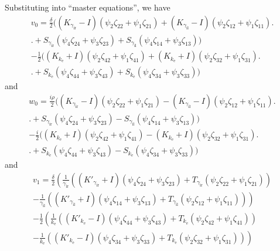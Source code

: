 Substituting into ``master equations'', we have
\begin{multline*}
  v_0 = \frac{\delta}{2} \bigl((K_{\gamma_\text{ir}}-I)(\psi_2 \zeta_{22}+\psi_1 \zeta_{21}) +(K_{\gamma_\text{il}}-I)(\psi_2 \zeta_{12}+\psi_1 \zeta_{11})\bigr. \\
  \bigl.+S_{\gamma_\text{ir}} (\psi_4 \zeta_{24}+\psi_3 \zeta_{23})+S_{\gamma_\text{il}} (\psi_4 \zeta_{14}+\psi_3 \zeta_{13})\bigr) \\
  -\frac{1}{2}\bigl((K_{k_\text{e}}+I)(\psi_2 \zeta_{42}+\psi_1 \zeta_{41}) +(K_{k_\text{e}} + I)(\psi_2 \zeta_{32}+\psi_1 \zeta_{31})\bigr. \\
  \bigl.+S_{k_\text{e}} (\psi_4 \zeta_{44}+\psi_3 \zeta_{43})+S_{k_\text{e}} (\psi_4 \zeta_{34}+\psi_3 \zeta_{33})\bigr)
\end{multline*}
and
\begin{multline*}
  w_0 = \frac{i \rho}{2} \bigl((K_{\gamma_\text{ir}}-I)(\psi_2 \zeta_{22}+\psi_1 \zeta_{21}) -(K_{\gamma_\text{il}}-I)(\psi_2 \zeta_{12}+\psi_1 \zeta_{11})\bigr. \\
  \bigl.+S_{\gamma_\text{ir}} (\psi_4 \zeta_{24}+\psi_3 \zeta_{23})-S_{\gamma_\text{il}} (\psi_4 \zeta_{14}+\psi_3 \zeta_{13})\bigr)\\
  -\frac{i}{2}\bigl((K_{k_\text{e}} + I)(\psi_2 \zeta_{42}+\psi_1 \zeta_{41}) - (K_{k_\text{e}} + I)(\psi_2 \zeta_{32}+\psi_1 \zeta_{31})\bigr. \\
  \bigl.+S_{k_\text{e}} (\psi_4 \zeta_{44}+\psi_3 \zeta_{43})-S_{k_\text{e}} (\psi_4 \zeta_{34}+\psi_3 \zeta_{33})\bigr)
\end{multline*}
and
\begin{multline*}
  v_1 = \frac{\delta}{2} \left(\frac{1}{\gamma_\text{ir}}\left((K'_{\gamma_\text{ir}} + I)(\psi_4 \zeta_{24}+\psi_3 \zeta_{23}) +T_{\gamma_\text{ir}} (\psi_2 \zeta_{22}+\psi_1 \zeta_{21})\right)\right.\\
  \left.-\frac{1}{\gamma_\text{il}}\left((K'_{\gamma_\text{il}} + I)(\psi_4 \zeta_{14}+\psi_3 \zeta_{13}) +T_{\gamma_\text{il}} (\psi_2 \zeta_{12}+\psi_1 \zeta_{11})\right)\right)\\
  -\frac{1}{2}\left(\frac{1}{k_\text{e}}\left((K'_{k_\text{e}}-I)(\psi_4 \zeta_{44}+\psi_3 \zeta_{43}) +T_{k_\text{e}} (\psi_2 \zeta_{42}+\psi_1 \zeta_{41})\right)\right.\\
  \left.-\frac{1}{k_\text{e}}\left((K'_{k_\text{e}}-I)(\psi_4 \zeta_{34}+\psi_3 \zeta_{33}) +T_{k_\text{e}} (\psi_2 \zeta_{32}+\psi_1 \zeta_{31})\right)\right)
\end{multline*}
